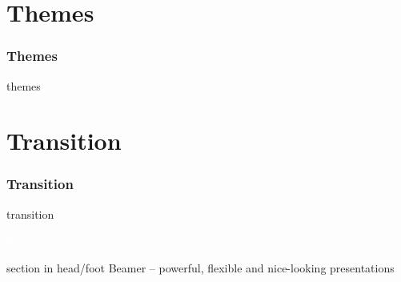 \documentclass[aspectratio=169,utf8]{ctexbeamer}
\begin{document}
\section*{Themes}
\begin{frame}
  \frametitle{Themes}
  themes
\end{frame}

\section*{Transition}
\begin{frame}
  \frametitle{Transition}
  transition
\end{frame}

\addtocounter{framenumber}{-1}


\begin{frame}[plain, b]
  \centering
  \Large \textcolor{white}{Thanks.}
  \normalsize

  \vspace*{\fill}

  \begin{beamercolorbox}[wd=\paperwidth]{section in head/foot}
    \centering
    \vskip3pt
    {\small Beamer -- powerful, flexible and nice-looking presentations}
    \vskip8pt
  \end{beamercolorbox}
  
\end{frame}
\end{document}
